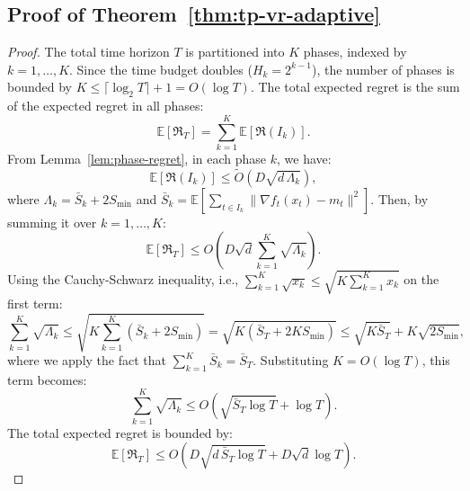 \documentclass[journal,onecolumn]{IEEEtran}
\theoremstyle{plain}
\theoremstyle{definition}
\theoremstyle{remark}
\newcommand{\regret}{\mathfrak{R}}
\begin{document}
{\subsection{Proof of Theorem~\ref{thm:tp-vr-adaptive}}
\begin{proof}
    The total time horizon $T$ is partitioned into $K$ phases, indexed by
    $k=1, \dots, K$. Since the time budget doubles ($H_{k} = 2^{k-1}$), the
    number of phases is bounded by
    $K \le \lceil \log_{2} T \rceil + 1 = O(\log T)$. The total expected regret is
    the sum of the expected regret in all phases:
    \begin{equation*}
        \mathbb{E}[\regret_{T}] = \sum_{k=1}^{K} \mathbb{E}[\regret(I_{k})].
    \end{equation*}
    From Lemma~\ref{lem:phase-regret}, in each phase $k$, we have:
    \begin{equation*}
        \mathbb{E}[\regret(I_{k})] \le \widetilde{O}\left( D\sqrt{d\,\Lambda_{k}}\right),
    \end{equation*}
    where $\Lambda_{k} = \bar S_{k}+ 2S_{\min}$ and $\bar S_{k} = \mathbb{E}[\sum_{t
    \in I_k}\|\nabla f_{t}(x_{t}) - m_{t}\|^{2}]$. Then, by summing it over $k=1,
    \dots, K$:
    \begin{equation*} %
        \mathbb{E}[\regret_{T}] \le O\left( D\sqrt{d}\sum_{k=1}^{K}
        \sqrt{\Lambda_{k}}\right).
    \end{equation*}
    Using the Cauchy-Schwarz inequality, i.e., $\sum_{k=1}^{K} \sqrt{x_{k}}\le \sqrt{K
    \sum_{k=1}^{K} x_{k}}$ on the first term:
    \begin{equation*}
        \sum_{k=1}^{K} \sqrt{\Lambda_{k}}\le \sqrt{K \sum_{k=1}^{K} (\bar S_{k}+2S_{\min})}= \sqrt{K (\bar S_{T} + 2KS_{\min})}\le \sqrt{K \bar S_{T}}+ K\sqrt{2S_{\min}}
        ,
    \end{equation*}
    where we apply the fact that $\sum_{k=1}^K \bar S_{k} = \bar S_{T}$. Substituting $K = O(\log
    T)$, this term becomes:
    \begin{equation*}
        \sum_{k=1}^{K} \sqrt{\Lambda_{k}}\le O\left(\sqrt{\bar S_{T} \log T}+
        \log T\right).
    \end{equation*}
    The total expected regret is
    bounded by:
    \begin{equation*}
        \mathbb{E}[\regret_{T}] \le O\left( D\sqrt{d\,\bar S_{T} \log T}+D\sqrt{d}\log T\right).
    \end{equation*}
\end{proof}

}
\end{document}
